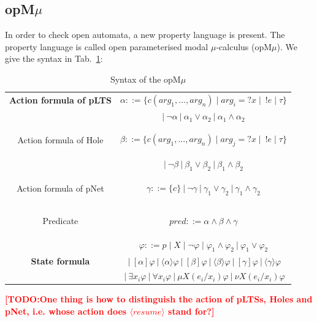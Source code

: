 \documentclass[runningheads,a4paper]{llncs}
\newcommand{\TODO}[1]{\textcolor{red}{\textbf{[TODO:#1]}}}
\begin{document}
\subsection{opM$\mu$}
In order to check open automata, a new property language is present. The property language is called open parameterised modal $\mu$-calculus (opM$\mu$). We give the syntax in Tab.~\ref{opmu}:

\begin{table}
	\setlength\tabcolsep{18pt}%
	\centering 
	\caption{Syntax of the opM$\mu$} \label{opmu}
	\begin{tabular}{>{\bfseries}c| c } 
		\hline 		
	Action formula of pLTS &     $\alpha ::= \{c(arg_{1}, ..., arg_{n})\mid arg_{i}=?x\mid\ !e\mid \tau\}$                  \\
	& $|\ \neg\alpha \ |\ \alpha_{1}\vee\alpha_{2}\ |\ \alpha_{1}\wedge\alpha_{2}$   \\ 	\hline 
	
	Action formula of Hole &     $\beta ::= \{c(arg_{1}, ..., arg_{n})\mid arg_{j}=?x\mid\ !e\mid \tau\}$                  \\
	& $|\ \neg\beta \ |\ \beta_{1}\vee\beta_{2}\ |\ \beta_{1}\wedge\beta_{2}$   \\ 	\hline 

	Action formula of pNet &     $\gamma ::= \{c\}\ |\ \neg\gamma \ |\ \gamma_{1}\vee\gamma_{2}\ |\ \gamma_{1}\wedge\gamma_{2}$   \\ 	\hline 		
		
	Predicate &     $pred ::= \alpha\wedge \beta\wedge \gamma$   \\ 	\hline 
		
	 	&  $\varphi ::= p \mid X \mid \neg\varphi \mid \varphi_{1}\wedge\varphi_{2}\ |\ \varphi_{1}\vee\varphi_{2} $\\
	 State formula & $\ |\ [\alpha]\varphi \ |\ \langle\alpha\rangle\varphi \ |\ [\beta]\varphi \ |\ \langle\beta\rangle\varphi \ |\ [\gamma]\varphi \ |\ \langle\gamma\rangle\varphi $  \\ 
	& $\ |\ \exists x_{i}\varphi\ |\ \forall x_{i}\varphi\ |\ \mu X(e_{i}/x_{i})\varphi\ |\ \nu X(e_{i}/x_{i})\varphi$	\\ \hline 
	\end{tabular} 
\end{table} 

\TODO{One thing is how to distinguish the action of pLTSs, Holes and pNet, i.e. whose action does $\langle resume\rangle$ stand for?}
\end{document}
